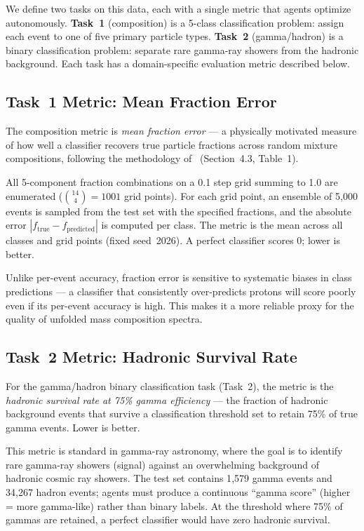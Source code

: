 \documentclass[universe,article,submit,pdftex,oneauthor]{Definitions/mdpi}
\begin{document}
We define two tasks on this data, each with a single metric that agents optimize autonomously. \textbf{Task~1} (composition) is a 5-class classification problem: assign each event to one of five primary particle types. \textbf{Task~2} (gamma/hadron) is a binary classification problem: separate rare gamma-ray showers from the hadronic background. Each task has a domain-specific evaluation metric described below.

\subsection{Task~1 Metric: Mean Fraction Error}

The composition metric is \textit{mean fraction error} --- a physically motivated measure of how well a classifier recovers true particle fractions across random mixture compositions, following the methodology of~\cite{kascade_jinst} (Section~4.3, Table~1).

All 5-component fraction combinations on a 0.1 step grid summing to 1.0 are enumerated ($\binom{14}{4} = 1001$ grid points). For each grid point, an ensemble of 5{,}000 events is sampled from the test set with the specified fractions, and the absolute error $|f_\mathrm{true} - f_\mathrm{predicted}|$ is computed per class. The metric is the mean across all classes and grid points (fixed seed~2026). A perfect classifier scores 0; lower is better.

Unlike per-event accuracy, fraction error is sensitive to systematic biases in class predictions --- a classifier that consistently over-predicts protons will score poorly even if its per-event accuracy is high. This makes it a more reliable proxy for the quality of unfolded mass composition spectra.

\subsection{Task~2 Metric: Hadronic Survival Rate}

For the gamma/hadron binary classification task (Task~2), the metric is the \textit{hadronic survival rate at 75\% gamma efficiency} --- the fraction of hadronic background events that survive a classification threshold set to retain 75\% of true gamma events. Lower is better.

This metric is standard in gamma-ray astronomy, where the goal is to identify rare gamma-ray showers (signal) against an overwhelming background of hadronic cosmic ray showers. The test set contains 1{,}579 gamma events and 34{,}267 hadron events; agents must produce a continuous ``gamma score'' (higher = more gamma-like) rather than binary labels. At the threshold where 75\% of gammas are retained, a perfect classifier would have zero hadronic survival.
\end{document}
